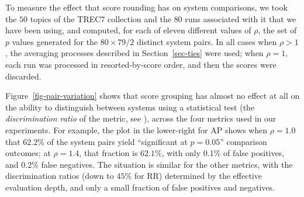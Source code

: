 To measure the effect that score rounding has on system comparisons,
we took the $50$ topics of the TREC7 collection and the $80$ runs
associated with it that we have been using, and computed, for each of
eleven different values of $\rho$, the set of $p$ values generated
for the $80\times79/2$ distinct system pairs.
In all cases when $\rho>1$, the averaging processes described in
Section~\ref{sec-ties} were used; when $\rho=1$, each run was
processed in resorted-by-score order, and then the scores were
discarded.

Figure~\ref{fig-pair-variation} shows that score grouping has almost
no effect at all on the ability to distinguish between systems using
a statistical test (the {\emph{discrimination ratio}} of the metric,
see {\citet{sakai07sigir}}), across the four metrics used in our
experiments.
For example, the plot in the lower-right for AP shows when $\rho=1.0$
that $62.2$\% of the system pairs yield ``significant at $p=0.05$''
comparison outcomes; at $\rho=1.4$, that fraction is $62.1\%$, with
only $0.1$\% of false positives, and $0.2$\% false negatives.
The situation is similar for the other metrics, with the
discrimination ratios (down to $45$\% for RR) determined by the
effective evaluation depth, and only a small fraction of false
positives and negatives.
